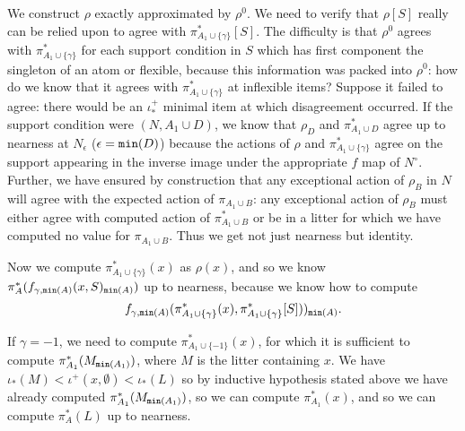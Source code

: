\documentclass[112pt]{article}
\begin{document}
\begin{description}
We construct $\rho$ exactly approximated by $\rho^0$.  We need to verify that $\rho[S]$ really can be relied upon to agree with $\pi^*_{A_1 \cup \{\gamma\}}[S]$.  The difficulty
is that $\rho^0$ agrees with $\pi^*_{A_1 \cup \{\gamma\}}$ for each support condition in $S$ which has first component the singleton of an atom or flexible, because this information was packed into $\rho^0$:  how do we know that it agrees with $\pi^*_{A_1 \cup \{\gamma\}}$  at inflexible items?  Suppose it failed to agree:  there would be an $\iota^+_*$ minimal item at which
disagreement occurred.  If the support condition were $(N,A_1 \cup D)$, we know that $\rho_D$ and $\pi^*_{A_1 \cup D}$ agree up to nearness at $N_\epsilon$ ($\epsilon = {\tt min}(D)$)
because the actions of $\rho$ and  $\pi^*_{A_1 \cup \{\gamma\}}$ agree on the support appearing in the inverse image under the appropriate $f$ map
of $N^\circ$.   Further, we have ensured by construction that any exceptional action of $\rho_B$ in $N$ will agree with the expected action of $\pi_{A_1 \cup B}$:  any exceptional action of $\rho_B$ must either agree with computed action of $\pi^*_{A_1 \cup B}$ or be in a litter for which we have computed no value for $\pi_{A_1 \cup B}$.  Thus we
get not just nearness but identity.

Now we compute  $\pi^*_{A_1\cup \{\gamma\}}(x)$ as $\rho(x)$, and so we know  $\pi^*_A(f_{\gamma,{\tt min}(A)}(x,S)_{{\tt min}(A)})$ up to nearness, because we know how to compute $$f_{ \gamma,{\tt min}(A)}(\pi^*_{A_1\cup \{\gamma\}}(x),\pi^*_{A_1\cup \{\gamma\}}[S]))_{{\tt min}(A)}.$$

If $\gamma=-1$, we need to compute $\pi^*_{A_1\cup \{-1\}}(x)$, for which it is sufficient to compute $\pi^*_{A_1}(M_{{\tt min}(A_1)})$, where $M$ is the litter containing $x$.  We have $\iota_*(M)<\iota^+(x,\emptyset)<\iota_*(L)$ so by inductive hypothesis stated above we have already computed  $\pi^*_{A_1}(M_{{\tt min}(A_1)})$, so we can compute $\pi^*_{A_1}(x)$, and so we can compute $\pi^*_A(L)$ up to nearness.

\begin{comment}
  The condition we need is that an if an atom $x$ belongs to a litter $M$ then the position of $(x,\emptyset)$ in
$\leq^+_{-1}$ is subsequent to the position of $(y,T)$ such that $f_{\delta,\epsilon}(y,T)=M$, and this is enforced in the construction of the $f$ maps.  The case of our additional recursive hypothesis with $C = \emptyset$ stated above works here:  we then have the action of $\pi^*_{A_1}$ computable at $(y,T)$ and so $\pi^*_A$ computable at $L$ up to nearness (of course if the values of $\delta, \epsilon$ do not exist or are such that $L$ is $A_1$-flexible this is unproblematic).
\end{comment}


\end{description}
\end{document}
